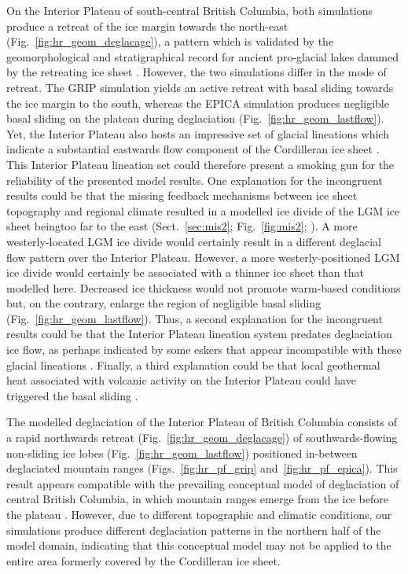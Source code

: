 \documentclass[tc, manuscript]{copernicus}
\begin{document}
On the Interior Plateau of south-central British Columbia, both simulations
produce a retreat of the ice margin towards the north-east
(Fig.~\ref{fig:hr_geom_deglacage}), a pattern which is validated by the geomorphological
and stratigraphical record for ancient pro-glacial lakes dammed by the
retreating ice sheet \citep{Perkins.Brennand.2014}. However, the two
simulations differ in the mode of retreat. The GRIP simulation yields an active
retreat with basal sliding towards the ice margin to the south, whereas the
EPICA simulation produces negligible basal sliding on the plateau during deglaciation
(Fig.~\ref{fig:hr_geom_lastflow}). Yet, the Interior Plateau also hosts an impressive
set of glacial lineations which indicate a substantial eastwards flow component
of the Cordilleran ice sheet \citep{Prest.etal.1968, Kleman.etal.2010}.
This Interior Plateau lineation set could therefore present a smoking gun for the
reliability of the presented model results. One explanation for the incongruent
results could be that the missing feedback mechanisms between ice sheet
topography and regional climate resulted in a modelled ice divide of the LGM
ice sheet beingtoo far to the east (Sect.~\ref{sec:mis2}; Fig.~\ref{fig:mis2};
\citealp{Seguinot.etal.2014}). A more westerly-located LGM ice divide would
certainly result in a different deglacial flow pattern over the Interior
Plateau. However, a more westerly-positioned LGM ice divide would certainly be
associated with a thinner ice sheet than that modelled here. Decreased ice
thickness would not promote warm-based conditions but, on the
contrary, enlarge the region of negligible basal sliding
(Fig.~\ref{fig:hr_geom_lastflow}). Thus, a second explanation for the incongruent
results could be that the Interior Plateau lineation system predates
deglaciation ice flow, as perhaps indicated by some eskers
that appear incompatible with these glacial lineations
\citep[Fig.~9]{Margold.etal.2013a}. Finally, a third explanation could be that
local geothermal heat associated with volcanic activity on the Interior Plateau
could have triggered the basal sliding
\citep[cf. Greenland ice sheet;][]{Fahnestock.etal.2001}.

The modelled deglaciation of the Interior Plateau of British Columbia
consists of a rapid northwards retreat (Fig.~\ref{fig:hr_geom_deglacage}) of
southwards-flowing non-sliding ice lobes (Fig.~\ref{fig:hr_geom_lastflow}) positioned
in-between deglaciated mountain ranges
(Figs.~\ref{fig:hr_pf_grip} and~\ref{fig:hr_pf_epica}). This result
appears compatible with the prevailing conceptual model of deglaciation of
central British Columbia, in which mountain ranges emerge from the ice before
the plateau \citep[Fig.~7]{Fulton.1991}. However, due to different topographic
and climatic conditions, our simulations produce different deglaciation
patterns in the northern half of the model domain, indicating that this
conceptual model may not be applied to the entire area formerly covered by the
Cordilleran ice sheet.
\end{document}
